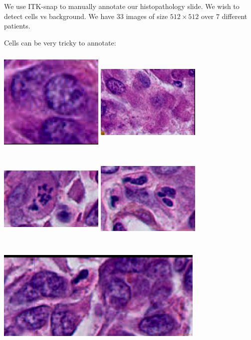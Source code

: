 \documentclass[a0,portrait]{a0poster}
\begin{document}
\begin{multicols}{2}
We use ITK-snap to manually annotate our histopathology slide. We wish to detect cells vs background. We have $33$ images of size $512 \times 512$ over $7$ different patients.

Cells can be very tricky to annotate: \\
\begin{multicols}{3}
\includegraphics[height=5cm, width = 5cm]{under1.png}
\includegraphics[height=5cm, width = 5cm]{under2.png}
\includegraphics[height=5cm, width = 5cm]{mitose.png}
\includegraphics[height=5cm, width = 5cm]{mitose2.png}
\includegraphics[height=5cm, width = 10cm]{clutered1.png}
\end{multicols}

\end{multicols}
\end{document}
